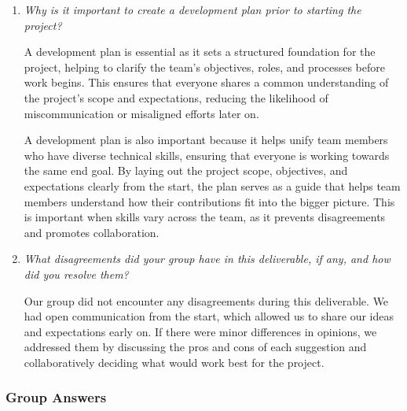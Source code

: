 \documentclass{article}
\begin{document}
\begin{enumerate}
  \item \textit{Why is it important to create a development plan prior to starting the project?}

  A development plan is essential as it sets a structured foundation for the project, helping to 
  clarify the team's objectives, roles, and processes before work begins. This ensures that everyone 
  shares a common understanding of the project's scope and expectations, reducing the likelihood 
  of miscommunication or misaligned efforts later on. 

  A development plan is also important because it helps unify team members who have diverse technical 
  skills, ensuring that everyone is working towards the same end goal. By laying out the project scope, 
  objectives, and expectations clearly from the start, the plan serves as a guide that helps team 
  members understand how their contributions fit into the bigger picture. This is important when 
  skills vary across the team, as it prevents disagreements and promotes collaboration.

  \item \textit{What disagreements did your group have in this deliverable, if any, and how did you resolve them?}

  Our group did not encounter any disagreements during this deliverable. We had open communication from 
  the start, which allowed us to share our ideas and expectations early on. If there were minor differences 
  in opinions, we addressed them by discussing the pros and cons of each suggestion and collaboratively 
  deciding what would work best for the project.

\end{enumerate}

\subsubsection*{Group Answers}
\end{document}
